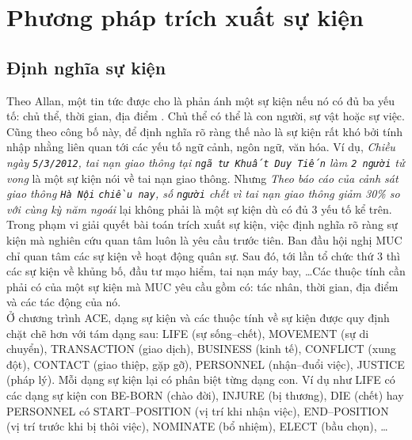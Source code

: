
\chapter{Phương pháp trích xuất sự kiện} %



\section{Định nghĩa sự kiện}
\noindent Theo Allan, một tin tức được cho là phản ánh một sự kiện nếu nó có đủ ba yếu tố: chủ thể, thời gian, địa điểm \cite{JRV98}. Chủ thể có thể là con người, sự vật hoặc sự việc. Cũng theo công bố này, để định nghĩa rõ ràng thế nào là sự kiện rất khó bởi tính nhập nhằng liên quan tới các yếu tố ngữ cảnh, ngôn ngữ, văn hóa. Ví dụ, \emph{Chiều ngày \texttt{5/3/2012}, tai nạn giao thông tại \texttt{ngã tư Khuất Duy Tiến} làm \texttt{2 người} tử vong} là một sự kiện nói về tai nạn giao thông. Nhưng \emph{Theo báo cáo của cảnh sát giao thông \texttt{Hà Nội} \texttt{chiều nay}, số \texttt{người} chết vì tai nạn giao thông giảm 30\% so với cùng kỳ năm ngoái} lại không phải là một sự kiện dù có đủ 3 yếu tố kể trên.
\\
\noindent Trong phạm vi giải quyết bài toán trích xuất sự kiện, việc định nghĩa rõ ràng sự kiện mà nghiên cứu quan tâm luôn là yêu cầu trước tiên. Ban đầu  hội nghị MUC chỉ quan tâm các sự kiện về hoạt động quân sự. Sau đó, tới lần tổ chức thứ 3 thì các sự kiện về khủng bố, đầu tư mạo hiểm, tai nạn máy bay, \ldots Các thuộc tính cần phải có của một sự kiện mà MUC yêu cầu gồm có: tác nhân, thời gian, địa điểm và các tác động của nó.
\\
\noindent Ở chương trình ACE, dạng sự kiện và các thuộc tính về sự kiện được quy định chặt chẽ hơn với tám dạng sau: LIFE (sự sống--chết), MOVEMENT (sự di chuyển), TRANSACTION (giao dịch), BUSINESS (kinh tế), CONFLICT (xung đột), CONTACT (giao thiệp, gặp gỡ), PERSONNEL (nhận--đuổi việc), JUSTICE (pháp lý). Mỗi dạng sự kiện lại có phân biệt từng dạng con. Ví dụ như LIFE có các dạng  sự kiện  con BE-BORN (chào đời), INJURE (bị thương), DIE (chết) hay PERSONNEL có START--POSITION (vị trí khi nhận việc), END--POSITION (vị trí trước khi bị thôi việc), NOMINATE (bổ nhiệm), ELECT (bầu chọn), \ldots

